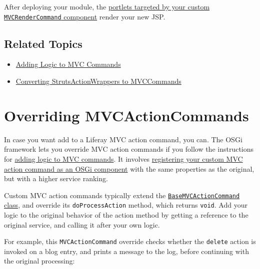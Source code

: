 After deploying your module, the
\href{/docs/7-2/customization/-/knowledge_base/c/adding-logic-to-mvc-commands\#step-2-publish-as-a-component}{portlets
targeted by your custom \texttt{MVCRenderCommand} component} render your
new JSP.

\section{Related Topics}\label{related-topics-28}

\begin{itemize}
\tightlist
\item
  \href{/docs/7-2/customization/-/knowledge_base/c/adding-logic-to-mvc-commands}{Adding
  Logic to MVC Commands}
\item
  \href{/docs/7-2/tutorials/-/knowledge_base/t/upgrading-struts-action-hooks}{Converting
  StrutsActionWrappers to MVCCommands}
\end{itemize}

\chapter{Overriding
MVCActionCommands}\label{overriding-mvcactioncommands}

In case you want add to a Liferay MVC action command, you can. The OSGi
framework lets you override MVC action commands if you follow the
instructions for
\href{/docs/7-2/customization/-/knowledge_base/c/adding-logic-to-mvc-commands}{adding
logic to MVC commands}. It involves
\href{/docs/7-1/tutorials/-/knowledge_base/t/adding-logic-to-mvc-commands\#publish-as-a-component}{registering
your custom MVC action command as an OSGi component} with the same
properties as the original, but with a higher service ranking.

Custom MVC action commands typically extend the
\href{https://docs.liferay.com/dxp/portal/7.2-latest/javadocs/portal-kernel/com/liferay/portal/kernel/portlet/bridges/mvc/BaseMVCActionCommand.html}{\texttt{BaseMVCActionCommand}
class}, and override its \texttt{doProcessAction} method, which returns
\texttt{void}. Add your logic to the original behavior of the action
method by getting a reference to the original service, and calling it
after your own logic.

For example, this \texttt{MVCActionCommand} override checks whether the
\texttt{delete} action is invoked on a blog entry, and prints a message
to the log, before continuing with the original processing:

